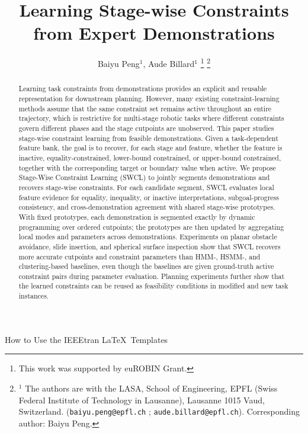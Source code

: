 \documentclass[lettersize,journal]{IEEEtran}
\begin{document}
\title{Learning Stage-wise Constraints from Expert Demonstrations}


\author{Baiyu Peng$^{1}$, Aude Billard$^{1}$%
\thanks{
This work was supported by euROBIN Grant.  } %
\thanks{$^{1}$ The authors are with the LASA, School of Engineering, EPFL (Swiss Federal Institute of Technology in Lausanne), Lausanne 1015 Vaud, Switzerland.
        ({\tt\footnotesize baiyu.peng@epfl.ch} ; {\tt\footnotesize aude.billard@epfl.ch}). Corresponding author: Baiyu Peng.}%

}
%
{How to Use the IEEEtran \LaTeX \ Templates}

\maketitle

\begin{abstract}
Learning task constraints from demonstrations provides an explicit and reusable representation for downstream planning. However, many existing constraint-learning methods assume that the same constraint set remains active throughout an entire trajectory, which is restrictive for multi-stage robotic tasks where different constraints govern different phases and the stage cutpoints are unobserved. This paper studies stage-wise constraint learning from feasible demonstrations. Given a task-dependent feature bank, the goal is to recover, for each stage and feature, whether the feature is inactive, equality-constrained, lower-bound constrained, or upper-bound constrained, together with the corresponding target or boundary value when active. We propose Stage-Wise Constraint Learning (SWCL) to jointly segments demonstrations and recovers stage-wise constraints. For each candidate segment, SWCL evaluates local feature evidence for equality, inequality, or inactive interpretations, subgoal-progress consistency, and cross-demonstration agreement with shared stage-wise prototypes. With fixed prototypes, each demonstration is segmented exactly by dynamic programming over ordered cutpoints; the prototypes are then updated by aggregating local modes and parameters across demonstrations. Experiments on planar obstacle avoidance, slide insertion, and spherical surface inspection show that SWCL recovers more accurate cutpoints and constraint parameters than HMM-, HSMM-, and clustering-based baselines, even though the baselines are given ground-truth active constraint pairs during parameter evaluation. Planning experiments further show that the learned constraints can be reused as feasibility conditions in modified and new task instances.
\end{abstract}
\end{document}
